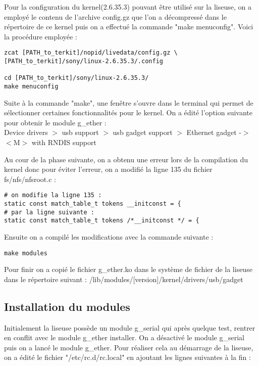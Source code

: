 Pour la configuration du kernel(2.6.35.3) pouvant être utilisé sur la liseuse, on a employé le contenu de l'archive config.gz que l'on a décompressé dans le répertoire de ce kernel puis on a effectué la commande "make menuconfig". Voici la procédure employée :

\begin{lstlisting}
zcat [PATH_to_terkit]/nopid/livedata/config.gz \
[PATH_to_terkit]/sony/linux-2.6.35.3/.config

cd [PATH_to_terkit]/sony/linux-2.6.35.3/
make menuconfig
\end{lstlisting}

Suite à la commande "make", une fenêtre s'ouvre dans le terminal qui permet de sélectionner certaines fonctionnalités pour le kernel. On a édité l'option suivante pour obtenir le module g_ether : \\
Device drivers $>$ usb support $>$ usb gadget support $>$ Ethernet gadget -$>$ $<$M$>$ with RNDIS support

Au cour de la phase suivante, on a obtenu une erreur lors de la compilation du kernel donc pour éviter l'erreur, on a modifié la ligne 135 du fichier fs/nfs/nfsroot.c :

\begin{lstlisting}
# on modifie la ligne 135 :
static const match_table_t tokens __initconst = {
# par la ligne suivante :
static const match_table_t tokens /*__initconst */ = { 
\end{lstlisting} 

Ensuite on a compilé les modifications avec la commande suivante :

\begin{lstlisting}
make modules
\end{lstlisting}

Pour finir on a copié le fichier g_ether.ko dans le système de fichier de la liseuse dans le répertoire suivant : /lib/modules/[version]/kernel/drivers/usb/gadget
 
\subsection{Installation du modules}

Initialement la liseuse possède un module g_serial qui après quelque test, rentrer en conflit avec le module g_ether installer. On a désactivé le module g_serial puis on  a lancé le module g_ether. Pour réaliser cela au démarrage de la liseuse, on a édité le fichier "/etc/rc.d/rc.local" en ajoutant les lignes suivantes à la fin : 

